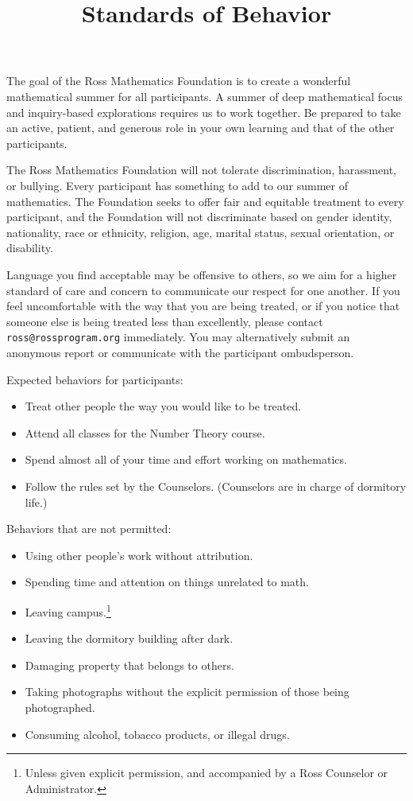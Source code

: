 \documentclass{ross}
\title{Standards of Behavior}
\makeatletter
\newcommand\footnoteref[1]{\protected@xdef\@thefnmark{\ref{#1}}\@footnotemark}
\makeatother
\begin{document}
\maketitle

The goal of the Ross Mathematics Foundation is to create a wonderful
mathematical summer for all participants.  A summer of deep
mathematical focus and inquiry-based explorations requires us to work
together.  Be prepared to take an active, patient, and generous role
in your own learning and that of the other participants.

The Ross Mathematics Foundation will not tolerate discrimination,
harassment, or bullying.  Every participant has something to add to
our summer of mathematics.  The Foundation seeks to offer fair and
equitable treatment to every participant, and the Foundation will not
discriminate based on gender identity, nationality, race or ethnicity,
religion, age, marital status, sexual orientation, or disability.

Language you find acceptable may be offensive to others, so we aim for
a higher standard of care and concern to communicate our respect for
one another.  If you feel uncomfortable with the way that you are being
treated, or if you notice that someone else is being treated less than
excellently, please contact \texttt{ross@rossprogram.org} immediately.
You may alternatively submit an anonymous report or communicate with
the participant ombudsperson.

Expected behaviors for participants:
\begin{itemize}
\item Treat other people the way you would like to be treated.
\item Attend all classes for the Number Theory course.
\item Spend almost all of your time and effort working on mathematics.
\item Follow the rules set by the Counselors. (Counselors are in charge of dormitory life.)
\end{itemize}

Behaviors that are not permitted:
\begin{itemize}
\item Using other people's work without attribution.
\item Spending time and attention on things unrelated to math.
\item Leaving campus.\footnote{\label{counselors}Unless given explicit permission, and accompanied by a Ross Counselor or Administrator.}
\item Leaving the dormitory building after dark.\footnoteref{counselors}
\item Damaging property that belongs to others.
\item Taking photographs without the explicit permission of those being photographed.
\item Consuming alcohol, tobacco products, or illegal drugs.
\end{itemize}
\end{document}
